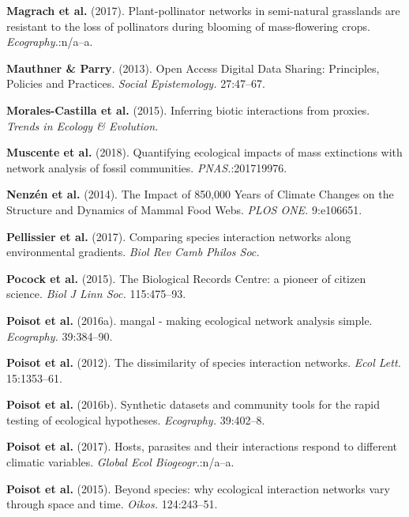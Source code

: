 \leavevmode\hypertarget{ref-MagrHolz17}{}%
\textbf{Magrach et al.} (2017). Plant-pollinator networks in
semi-natural grasslands are resistant to the loss of pollinators during
blooming of mass-flowering crops. \emph{Ecography.}:n/a--a.

\leavevmode\hypertarget{ref-MautParr13}{}%
\textbf{Mauthner \& Parry}. (2013). Open Access Digital Data Sharing:
Principles, Policies and Practices. \emph{Social Epistemology.}
27:47--67.

\leavevmode\hypertarget{ref-MoraMati15}{}%
\textbf{Morales-Castilla et al.} (2015). Inferring biotic interactions
from proxies. \emph{Trends in Ecology \& Evolution.}

\leavevmode\hypertarget{ref-MuscPrab18}{}%
\textbf{Muscente et al.} (2018). Quantifying ecological impacts of mass
extinctions with network analysis of fossil communities.
\emph{PNAS.}:201719976.

\leavevmode\hypertarget{ref-NenzMont14}{}%
\textbf{Nenzén et al.} (2014). The Impact of 850,000 Years of Climate
Changes on the Structure and Dynamics of Mammal Food Webs. \emph{PLOS
ONE.} 9:e106651.

\leavevmode\hypertarget{ref-PellAlbo17}{}%
\textbf{Pellissier et al.} (2017). Comparing species interaction
networks along environmental gradients. \emph{Biol Rev Camb Philos Soc.}

\leavevmode\hypertarget{ref-PocoRoy15}{}%
\textbf{Pocock et al.} (2015). The Biological Records Centre: a pioneer
of citizen science. \emph{Biol J Linn Soc.} 115:475--93.

\leavevmode\hypertarget{ref-PoisBais16}{}%
\textbf{Poisot et al.} (2016a). mangal - making ecological network
analysis simple. \emph{Ecography.} 39:384--90.

\leavevmode\hypertarget{ref-PoisCana12}{}%
\textbf{Poisot et al.} (2012). The dissimilarity of species interaction
networks. \emph{Ecol Lett.} 15:1353--61.

\leavevmode\hypertarget{ref-PoisGrav16}{}%
\textbf{Poisot et al.} (2016b). Synthetic datasets and community tools
for the rapid testing of ecological hypotheses. \emph{Ecography.}
39:402--8.

\leavevmode\hypertarget{ref-PoisGuev17}{}%
\textbf{Poisot et al.} (2017). Hosts, parasites and their interactions
respond to different climatic variables. \emph{Global Ecol
Biogeogr.}:n/a--a.

\leavevmode\hypertarget{ref-PoisStou15}{}%
\textbf{Poisot et al.} (2015). Beyond species: why ecological
interaction networks vary through space and time. \emph{Oikos.}
124:243--51.

